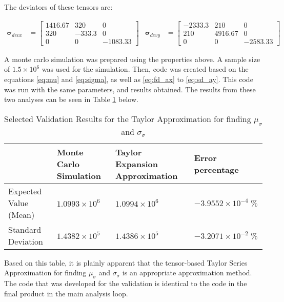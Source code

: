 The deviators of these tensors are: 

\begin{align*}
\mathbf{\sigma}_{devx} &= \left[ 
\begin{matrix}
1416.67 & 320 & 0\\
320 & -333.3 & 0\\
0 & 0 & -1083.33
\end{matrix}
\right]
&\mathbf{\sigma}_{devy} &= \left[
\begin{matrix}
-2333.3&210&0\\
210&4916.67&0\\
0&0&-2583.33
\end{matrix}
\right]
\end{align*}

A monte carlo simulation was prepared using the properties above. A sample size of $1.5\times 10^6$ was used for the simulation. Then, code was created based on the equations \ref{eq:mu} and \ref{eq:sigma}, as well as \ref{eq:fd_ax} to \ref{eq:sd_ay}. This code was run with the same parameters, and results obtained. The results from these two analyses can be seen in Table \ref{tab:val_tensors} below. 

\begin{table}[!hbtp]
\caption{Selected Validation Results for the Taylor Approximation for finding $\mu_\sigma$ and $\sigma_\sigma$}
\small
\label{tab:val_tensors}
\begin{center}
\begin{tabular}{|l|p{2.1cm}|p{2.5cm}|p{2.5cm}|}
\hline
& Monte Carlo Simulation & Taylor Expansion Approximation & Error percentage\\
\hline
Expected Value (Mean) & $1.0993 \times 10^6$ & $1.0994 \times 10^6$ & $-3.9552 \times 10^{-4} \;\%$\\
Standard Deviation & $1.4382 \times 10^5$ & $1.4386 \times 10^5$ & $-3.2071 \times 10^{-2} \;\%$\\
\hline
\end{tabular}
\end{center}
\end{table}

Based on this table, it is plainly apparent that the tensor-based Taylor Series Approximation for finding $\mu_\sigma$ and $\sigma_\sigma$ is an appropriate approximation method. The code that was developed for the validation is identical to the code in the final product in the main analysis loop. 
